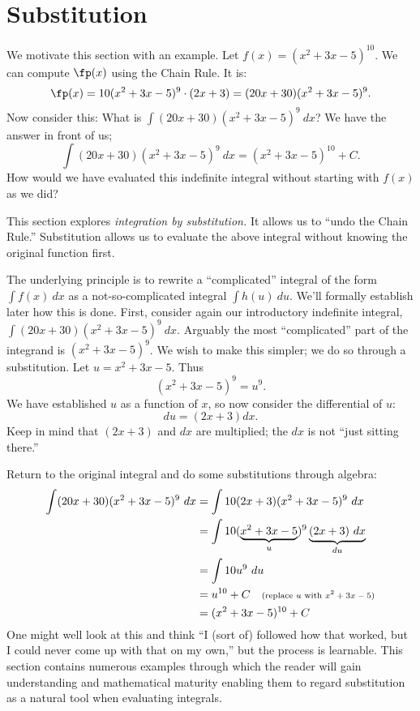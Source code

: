 \section{Substitution}\label{sec:substitution}

We motivate this section with an example. Let $f(x) = (x^2+3x-5)^{10}$. We can compute $\fp(x)$ using the Chain Rule. It is:
\[\fp(x) = 10(x^2+3x-5)^9\cdot(2x+3) = (20x+30)(x^2+3x-5)^9.\]
Now consider this: What is $\int (20x+30)(x^2+3x-5)^9\ dx$? We have the answer in front of us;
\[\int (20x+30)(x^2+3x-5)^9\ dx = (x^2+3x-5)^{10}+C.\]
How would we have evaluated this indefinite integral without starting with $f(x)$ as we did?

This section explores \textit{integration by substitution.} It allows us to ``undo the Chain Rule.'' Substitution allows us to evaluate the above integral without knowing the original function first.

The underlying principle is to rewrite a ``complicated'' integral of the form $\int f(x)\ dx$ as a not-so-complicated integral $\int h(u)\ du$. We'll formally establish later how this is done. First, consider again our introductory indefinite integral, $\int (20x+30)(x^2+3x-5)^9\ dx$. Arguably the most ``complicated'' part of the integrand is $(x^2+3x-5)^9$. We wish to make this simpler; we do so through a substitution. Let $u=x^2+3x-5$. Thus
\[(x^2+3x-5)^9 = u^9.\]
We have established $u$ as a function of $x$, so now consider the differential of $u$:
\[du = (2x+3)dx.\]
Keep in mind that $(2x+3)$ and $dx$ are multiplied; the $dx$ is not ``just sitting there.''

Return to the original integral and do some substitutions through algebra:
\begin{align*}
	\int (20x+30)(x^2+3x-5)^9\ dx
	&=	\int 10(2x+3)(x^2+3x-5)^9\ dx \\
	&=\int 10(\underbrace{x^2+3x-5}_u)^9\underbrace{(2x+3)\ dx}_{du} \\
	&=\int 10u^9\ du \\
	&= u^{10} + C \quad \text{\scriptsize (replace $u$ with $x^2+3x-5$)}\\
	&= (x^2+3x-5)^{10} +C
\end{align*}
One might well look at this and think ``I (sort of) followed how that worked, but I could never come up with that on my own,'' but the process is learnable. This section contains numerous examples through which the reader will gain understanding and mathematical maturity enabling them to regard substitution as a natural tool when evaluating integrals.

